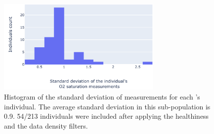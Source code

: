 \begin{figure}[!h]
    \centering
    \includegraphics[width=80mm]{Chapter1/Figs/br_o2sat_std_hist.png}
    \caption{Histogram of the standard deviation of \OXSat measurements for each \BR's individual. The average standard deviation in this sub-population is 0.9. 54/213 individuals were included after applying the healthiness and the data density filters.}
    \label{fig:o2sat_std_hist}
\end{figure}

